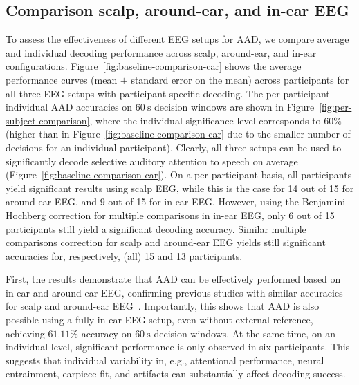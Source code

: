 \documentclass[fleqn,10pt]{wlscirep}
\begin{document}
	\subsection*{Comparison scalp, around-ear, and in-ear EEG}
	To assess the effectiveness of different EEG setups for AAD, we compare average and individual decoding performance across scalp, around-ear, and in-ear configurations. Figure~\ref{fig:baseline-comparison-car} shows the average performance curves (mean $\pm$ standard error on the mean) across participants for all three EEG setups with participant-specific decoding. The per-participant individual AAD accuracies on $\SI{60}{\second}$ decision windows are shown in Figure~\ref{fig:per-subject-comparison}, where the individual significance level corresponds to $60\%$ (higher than in Figure~\ref{fig:baseline-comparison-car} due to the smaller number of decisions for an individual participant). Clearly, all three setups can be used to significantly decode selective auditory attention to speech on average (Figure~\ref{fig:baseline-comparison-car}). On a per-participant basis, all participants yield significant results using scalp EEG, while this is the case for 14 out of 15 for around-ear EEG, and 9 out of 15 for in-ear EEG. However, using the Benjamini-Hochberg correction for multiple comparisons in in-ear EEG, only 6 out of 15 participants still yield a significant decoding accuracy. Similar multiple comparisons correction for scalp and around-ear EEG yields still significant accuracies for, respectively, (all) 15 and 13 participants.
	
	First, the results demonstrate that AAD can be effectively performed based on in-ear and around-ear EEG, confirming previous studies with similar accuracies for scalp and around-ear EEG~\cite{geirnaert2021eegBased,mirkovic2016target,holtze2022ear,fiedler2017single,thornton2024comparison}. Importantly, this shows that AAD is also possible using a fully in-ear EEG setup, even without external reference, achieving $61.11\%$ accuracy on $\SI{60}{\second}$ decision windows. At the same time, on an individual level, significant performance is only observed in six participants. This suggests that individual variability in, e.g., attentional performance, neural entrainment, earpiece fit, and artifacts can substantially affect decoding success.
	
\end{document}
